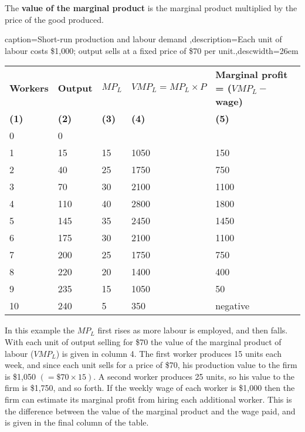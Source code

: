 \begin{DefBox}
The \textbf{value of the marginal product} is the marginal product multiplied by the price of the good produced.
\end{DefBox}

\begin{Table}{caption={Short-run production and labour demand \label{table:srprodlabourdemand}},description={Each unit of labour costs \$1,000; output sells at a fixed price of \$70 per unit.},descwidth={26em}}
\begin{tabu} to \linewidth {|X[1,c]X[1,c]X[1,c]X[1.5,c]X[1.5,c]|} \hline 
{}	\textbf{Workers} & \textbf{Output} & \textbf{$MP_L$} & \textbf{$VMP_L=MP_L\times P$} & \textbf{Marginal profit = ($VMP_L-$wage) } \\[-0.05em]
\textbf{(1)}	&	\textbf{(2)}	&	\textbf{(3)}	&	\textbf{(4)}	&	\textbf{(5)}	\\	 & 0	&		&		&			\\
	1 & 15	& 15	& 1050	& 150		\\
						2 & 40	& 25	& 1750	& 750		\\
	3 & 70	& 30	& 2100	& 1100		\\ 
						4 & 110 & 40	& 2800	& 1800		\\
	5 & 145 & 35	& 2450	& 1450		\\
						6 & 175 & 30	& 2100	& 1100		\\
	7 & 200 & 25	& 1750	& 750		\\
						8 & 220 & 20	& 1400	& 400		\\
	9 & 235 & 15	& 1050	& 50		\\
						10& 240 & 5		& 350	& negative	\\ \hline 
\end{tabu}
\end{Table}

\newhtmlpage



In this example the $MP_{L}$ first rises as more labour is employed, and
then falls. With each unit of output selling for \$70 the value of the
marginal product of labour ($VMP_{L}$) is given in column 4. The first
worker produces 15 units each week, and since each unit sells for a price of
\$70, his production value to the firm is \$1,050 $(=\$70\times 15)$. A
second worker produces 25 units, so his value to the firm is \$1,750, and so
forth. If the weekly wage of each worker is \$1,000 then the firm can
estimate its marginal profit from hiring each additional worker. This is the
difference between the value of the marginal product and the wage paid, and
is given in the final column of the table.


